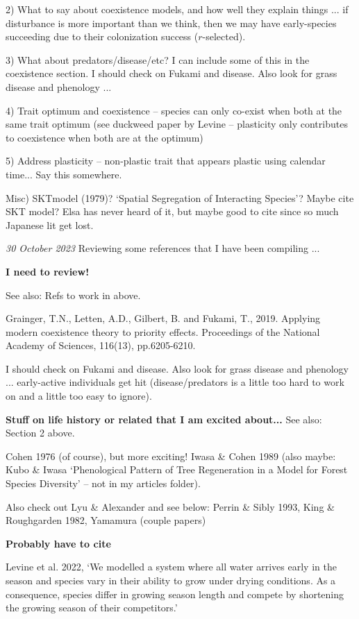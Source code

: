 \documentclass[11pt]{article}
\begin{document}
2) What to say about coexistence models, and how well they explain things ... if disturbance is more important than we think, then we may have early-species succeeding due to their colonization success ($r$-selected). 

3) What about predators/disease/etc? I can include some of this in the coexistence section. I should check on Fukami and disease. Also look for grass disease and phenology ... 

4) Trait optimum and coexistence -- species can only co-exist when both at the same trait optimum (see duckweed paper by Levine -- plasticity only contributes to coexistence when both are at the optimum)

5) Address plasticity -- non-plastic trait that appears plastic using calendar time... Say this somewhere. 

Misc) SKTmodel (1979)? `Spatial Segregation of Interacting Species'?
Maybe cite SKT model? Elsa has never heard of it, but maybe good to cite since so much Japanese lit get lost.

\emph{30 October 2023} Reviewing some references that I have been compiling ... 

{\bf I need to review!}

See also: Refs to work in above. 

Grainger, T.N., Letten, A.D., Gilbert, B. and Fukami, T., 2019. Applying modern coexistence theory to priority effects. Proceedings of the National Academy of Sciences, 116(13), pp.6205-6210. 

I should check on Fukami and disease. Also look for grass disease and phenology ... early-active individuals get hit (disease/predators is a little too hard to work on and a little too easy to ignore). 

{\bf Stuff on life history or related that I am excited about...} See also: Section 2 above. 

Cohen 1976 (of course), but more exciting! Iwasa \& Cohen 1989 (also maybe: Kubo \& Iwasa `Phenological Pattern of Tree Regeneration in a Model for Forest Species Diversity' -- not in my articles folder). 

Also check out Lyu \& Alexander and see below: Perrin \& Sibly 1993, King \& Roughgarden 1982, Yamamura (couple papers)

{\bf Probably have to cite}

Levine et al. 2022, `We modelled a system where all water arrives early in the season and species vary in their ability to grow under drying conditions. As a consequence, species differ in growing season length and compete by shortening the growing season of their competitors.'
\end{document}
